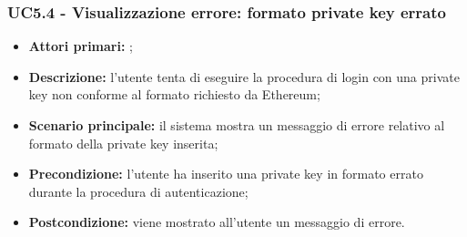 \subsubsection{UC5.4 - Visualizzazione errore: formato private key errato}
\begin{itemize}
	\item \textbf{Attori primari:} \una{};
	\item \textbf{Descrizione:} l’utente tenta di eseguire la procedura di login con una private key non conforme al formato richiesto da Ethereum; 
	\item \textbf{Scenario principale:} il sistema mostra un messaggio di errore relativo al formato della private key inserita;
	\item \textbf{Precondizione:} l'utente ha inserito una private key in formato errato durante la procedura di autenticazione;
	\item \textbf{Postcondizione:} viene mostrato all’utente un messaggio di errore. 
\end{itemize}